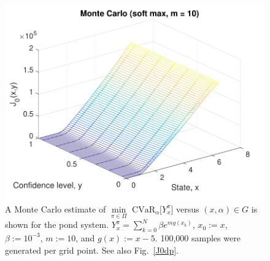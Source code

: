 \documentclass[letterpaper, 10 pt, conference]{ieeeconf}  %
\begin{document}
\begin{figure}[thpb]
      \centering
      \includegraphics[scale=0.5]{monte_carlo_sum_sept112018.pdf}
      \caption{A Monte Carlo estimate of ${\underset{\pi \in \Pi}\min} \text{ CVaR}_\alpha \big[ Y_x^\pi \big]$ versus $(x, \alpha) \in G$ is shown for the pond system.
	  $Y_x^\pi = \sum_{k=0}^N \beta e^{m g(x_k)}$, $x_0 := x$, $\beta := 10^{-3}$, $m := 10$, and $g(x) := x-5$.
	  100,000 samples were generated per grid point. See also Fig.~\ref{J0dp}.}
      \label{J0mc}
\end{figure}
\end{document}
